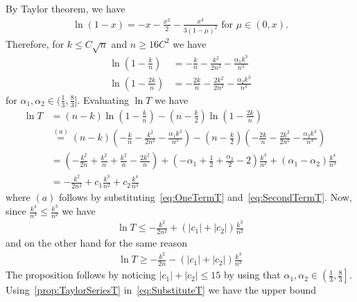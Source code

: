         By Taylor theorem, we have 
        \begin{align}\label{eq:lnXBds}
            \ln(1-x) = -x - \frac{x^2}{2} - \frac{x^3}{3(1-\mu)^2} \text{ for } \mu \in (0,x).
        \end{align}
        Therefore, for $k \le C\sqrt{n}$ and $n \ge 16C^2$ we have 
        \begin{align}
            \ln\left(1-\frac{k}{n}\right) &= -\frac{k}{n} - \frac{k^2}{2n^2} - \frac{\alpha_1k^3}{n^3} \label{eq:OneTermT}\\
            \ln\left(1-\frac{2k}{n}\right) &= -\frac{2k}{n} - \frac{2k^2}{2n^2} - \frac{\alpha_2k^3}{n^3} \label{eq:SecondTermT}
        \end{align}
        for $\alpha_1,\alpha_2 \in \Big(\frac{1}{3},\frac{8}{3}\Big]$. Evaluating $\ln T$ we have 
        \begin{align}
            \ln T &= (n-k)\ln\left(1-\frac{k}{n}\right) - \left(n-\frac{k}{2}\right)\ln\left(1-\frac{2k}{n}\right)  \nonumber\\
            &\stackrel{(a)}{=} (n-k)\left(-\frac{k}{n} - \frac{k^2}{2n^2} - \frac{\alpha_1k^3}{n^3}\right) - \left(n-\frac{k}{2}\right)\left(-\frac{2k}{n} - \frac{2k^2}{2n^2} - \frac{\alpha_2k^3}{n^3}\right) \nonumber\\
            &= \left(-\frac{k^2}{2n}+\frac{k^2}{n}+\frac{k^2}{n}-\frac{2k^2}{n}\right)+\left(-\alpha_1+\frac{1}{2}+\frac{\alpha_2}{2}-2\right)\frac{k^3}{n^2}+\left(\alpha_1-\alpha_2\right)\frac{k^4}{n^3} \nonumber\\
            &= -\frac{k^2}{2n^2} + c_1\frac{k^3}{n^2} + c_2\frac{k^4}{n^3} \label{eq:subc1c2}
        \end{align}
        where $(a)$ follows by substituting~\cref{eq:OneTermT} and~\cref{eq:SecondTermT}. Now, since $\frac{k^4}{n^3} \le \frac{k^3}{n^2}$ we have 
        \begin{align}
         \ln T  \le  -\frac{k^2}{2n^2} +  (|c_1|+|c_2|)\frac{k^3}{n^2}
        \end{align}
        and on the other hand for the same reason 
        \begin{align}
            \ln T \ge -\frac{k^2}{2n} - (|c_1|+|c_2|)\frac{k^3}{n^2}
        \end{align}
        The proposition follows by noticing $|c_1|+|c_2| \le 15$ by using that $\alpha_1, \alpha_2 \in \left(\frac{1}{3},\frac{8}{3}\right]$.
    \hfill \Halmos
    \endproof
Using~\cref{prop:TaylorSeriesT} in~\cref{eq:SubstituteT} we have the upper bound 
